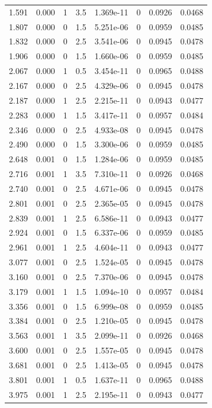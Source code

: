 \documentclass[preview]{standalone}
\begin{document}
{{\begin{tabular}{L{1.2cm}C{1.2cm} C{0.3cm}C{0.5cm} C{1.4cm}C{1.4cm} C{1.4cm}C{1.4cm}}
  1.591  &  0.000  & 1     & 3.5 &  1.369e-11  & 0  & 0.0926 &  0.0468   \\ 
  1.807  &  0.000  & 0     & 1.5 &  5.251e-06  & 0  & 0.0959 &  0.0485   \\ 
  1.832  &  0.000  & 0     & 2.5 &  3.541e-06  & 0  & 0.0945 &  0.0478   \\ 
  1.906  &  0.000  & 0     & 1.5 &  1.660e-06  & 0  & 0.0959 &  0.0485   \\ 
  2.067  &  0.000  & 1     & 0.5 &  3.454e-11  & 0  & 0.0965 &  0.0488   \\ 
  2.167  &  0.000  & 0     & 2.5 &  4.329e-06  & 0  & 0.0945 &  0.0478   \\ 
  2.187  &  0.000  & 1     & 2.5 &  2.215e-11  & 0  & 0.0943 &  0.0477   \\ 
  2.283  &  0.000  & 1     & 1.5 &  3.417e-11  & 0  & 0.0957 &  0.0484   \\ 
  2.346  &  0.000  & 0     & 2.5 &  4.933e-08  & 0  & 0.0945 &  0.0478   \\ 
  2.490  &  0.000  & 0     & 1.5 &  3.300e-06  & 0  & 0.0959 &  0.0485   \\ 
  2.648  &  0.001  & 0     & 1.5 &  1.284e-06  & 0  & 0.0959 &  0.0485   \\ 
  2.716  &  0.001  & 1     & 3.5 &  7.310e-11  & 0  & 0.0926 &  0.0468   \\ 
  2.740  &  0.001  & 0     & 2.5 &  4.671e-06  & 0  & 0.0945 &  0.0478   \\ 
  2.801  &  0.001  & 0     & 2.5 &  2.365e-05  & 0  & 0.0945 &  0.0478   \\ 
  2.839  &  0.001  & 1     & 2.5 &  6.586e-11  & 0  & 0.0943 &  0.0477   \\ 
  2.924  &  0.001  & 0     & 1.5 &  6.337e-06  & 0  & 0.0959 &  0.0485   \\ 
  2.961  &  0.001  & 1     & 2.5 &  4.604e-11  & 0  & 0.0943 &  0.0477   \\ 
  3.077  &  0.001  & 0     & 2.5 &  1.524e-05  & 0  & 0.0945 &  0.0478   \\ 
  3.160  &  0.001  & 0     & 2.5 &  7.370e-06  & 0  & 0.0945 &  0.0478   \\ 
  3.179  &  0.001  & 1     & 1.5 &  1.094e-10  & 0  & 0.0957 &  0.0484   \\ 
  3.356  &  0.001  & 0     & 1.5 &  6.999e-08  & 0  & 0.0959 &  0.0485   \\ 
  3.384  &  0.001  & 0     & 2.5 &  1.210e-05  & 0  & 0.0945 &  0.0478   \\ 
  3.563  &  0.001  & 1     & 3.5 &  2.099e-11  & 0  & 0.0926 &  0.0468   \\ 
  3.600  &  0.001  & 0     & 2.5 &  1.557e-05  & 0  & 0.0945 &  0.0478   \\ 
  3.681  &  0.001  & 0     & 2.5 &  1.413e-05  & 0  & 0.0945 &  0.0478   \\ 
  3.801  &  0.001  & 1     & 0.5 &  1.637e-11  & 0  & 0.0965 &  0.0488   \\ 
  3.975  &  0.001  & 1     & 2.5 &  2.195e-11  & 0  & 0.0943 &  0.0477   \\ 
\hline 
\end{tabular} 

}}
\end{document}
